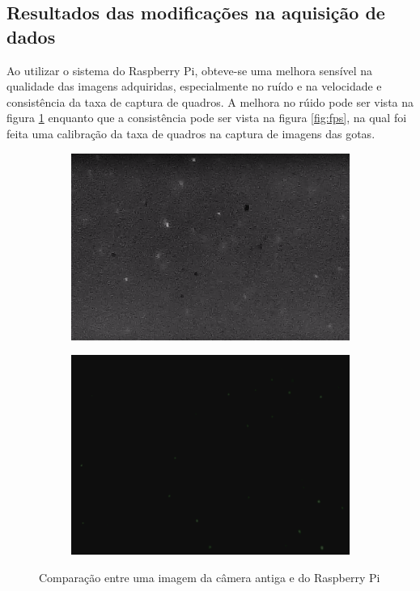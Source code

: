 \documentclass[twoside, twocolumn]{article}
\begin{document}
\subsection{Resultados das modificações na aquisição de dados}

Ao utilizar o sistema do Raspberry Pi, obteve-se uma melhora sensível na qualidade das imagens adquiridas, especialmente no ruído e na velocidade e consistência da taxa de captura de quadros. A melhora no rúido pode ser vista na figura \ref{fig:cam} enquanto que a consistência pode ser vista na figura \ref{fig:fps}, na qual foi feita uma calibração da taxa de quadros na captura de imagens das gotas. 

\begin{figure}[h]
	\centering
    \begin{subfigure}[b]{0.8\linewidth}
    	\includegraphics[width = \linewidth]{cam1}
    \end{subfigure}
        \begin{subfigure}[b]{0.8\linewidth}
    	\includegraphics[width = \linewidth]{cam2}
    \end{subfigure}
    \caption{Comparação entre uma imagem da câmera antiga e do Raspberry Pi}
    \label{fig:cam}
\end{figure}
\end{document}

